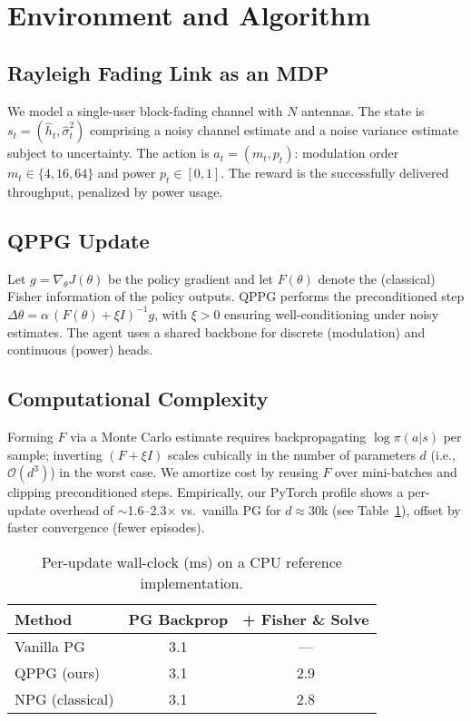 \documentclass[10pt,conference]{IEEEtran}
\begin{document}
\section{Environment and Algorithm}
\subsection{Rayleigh Fading Link as an MDP}
We model a single-user block-fading channel with $N$ antennas. The state is $s_t = (\hat{h}_t, \hat{\sigma}^2_t)$ comprising a noisy channel estimate and a noise variance estimate subject to uncertainty. The action is $a_t = (m_t, p_t)$: modulation order $m_t \in \{4,16,64\}$ and power $p_t \in [0,1]$. The reward is the successfully delivered throughput, penalized by power usage.

\subsection{QPPG Update}
Let $g = \nabla_\theta J(\theta)$ be the policy gradient and let $F(\theta)$ denote the (classical) Fisher information of the policy outputs. QPPG performs the preconditioned step
$\Delta\theta = \alpha \,(F(\theta)+\xi I)^{-1} g$,
with $\xi>0$ ensuring well-conditioning under noisy estimates. The agent uses a shared backbone for discrete (modulation) and continuous (power) heads.

\subsection{Computational Complexity}
Forming $F$ via a Monte Carlo estimate requires backpropagating $\log\pi(a|s)$ per sample; inverting $(F+\xi I)$ scales cubically in the number of parameters $d$ (i.e., $\mathcal{O}(d^3)$) in the worst case. We amortize cost by reusing $F$ over mini-batches and clipping preconditioned steps. Empirically, our PyTorch profile shows a per-update overhead of $\sim$1.6--2.3$\times$ vs.\ vanilla PG for $d\approx 30$k (see Table~\ref{tab:profile}), offset by faster convergence (fewer episodes).

\begin{table}[t]
\centering
\caption{Per-update wall-clock (ms) on a CPU reference implementation.}
\label{tab:profile}
\begin{tabular}{lcc}
\toprule
Method & PG Backprop & + Fisher \& Solve \\
\midrule
Vanilla PG & 3.1 & --- \\
QPPG (ours) & 3.1 & 2.9 \\
NPG (classical) & 3.1 & 2.8 \\
\bottomrule
\end{tabular}
\end{table}
\end{document}
